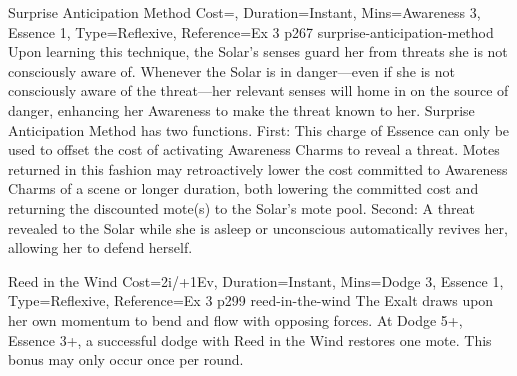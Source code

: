 \begin{Charm}{Surprise Anticipation Method}{
    Cost=\NoCost,
    Duration=Instant,
    Mins={Awareness 3, Essence 1},
    Type=Reflexive,
    Reference=Ex 3 p267
}{surprise-anticipation-method}
    Upon learning this technique, the Solar’s senses guard her from threats she
    is not consciously aware of. Whenever the Solar is in danger—even if she is
    not consciously aware of the threat—her relevant senses will home in on the
    source of danger, enhancing her Awareness to make the threat known to her.
    Surprise Anticipation Method has two functions. First:  This charge of Essence can only be used to
    offset the cost of activating Awareness Charms to reveal a threat. Motes
    returned in this fashion may retroactively lower the cost committed to
    Awareness Charms of a scene or longer duration, both lowering the committed
    cost and returning the discounted mote(s) to the Solar’s mote pool. Second:
     A threat
    revealed to the Solar while she is asleep or unconscious automatically
    revives her, allowing her to defend herself.
\end{Charm}




\begin{Charm}{Reed in the Wind}{
    Cost=2i/+1Ev,
    Duration=Instant,
    Mins={Dodge 3, Essence 1},
    Type=Reflexive,
    Reference=Ex 3 p299
}{reed-in-the-wind}
    The Exalt draws upon her own momentum to bend and flow with opposing
    forces.  At Dodge
    5+, Essence 3+, a successful dodge with Reed in the Wind restores one mote.
    This bonus may only occur once per round.
\end{Charm}




